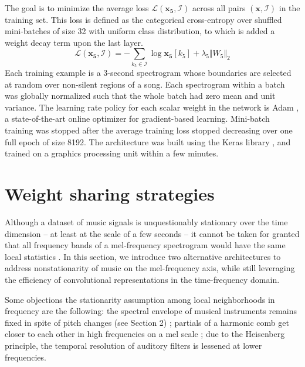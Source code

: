 \documentclass{article}
\begin{document}
The goal is to minimize the average loss $\mathscr{L}(\boldsymbol{x_5}, \mathcal{I})$
across all pairs $(\boldsymbol{x}, \mathcal{I})$ in the training set. This loss is defined as
the categorical cross-entropy over shuffled mini-batches of size 32 with uniform
class distribution, to which is added a weight decay term upon the last layer.
\begin{equation}
\mathscr{L}(\boldsymbol{x_5}, \mathcal{I}) =
- \sum_{k_5 \in \mathcal{I}} \log \boldsymbol{x_5}[k_5]
+ \lambda_5 \Vert W_5 \Vert_2
\end{equation}
Each training example is a 3-second spectrogram whose boundaries are selected at random
over non-silent regions of a song.
Each spectrogram within a batch was globally normalized
such that the whole batch had zero mean and unit variance.
The learning rate policy for each scalar weight in the network is Adam \cite{Kingma2015},
a state-of-the-art online optimizer for gradient-based learning.
Mini-batch training was stopped after the average training loss stopped
decreasing over one full epoch of size 8192.
The architecture was built using the Keras library \cite{Chollet2015},
and trained on a graphics processing unit within a few minutes.

\section{Weight sharing strategies}
Although a dataset of music signals is unquestionably stationary over the time
dimension -- at least at the scale of a few seconds -- it cannot be taken for granted
that all frequency bands of a mel-frequency spectrogram would have the same
local statistics \cite{Humphrey2013}.
In this section, we introduce two alternative architectures to address
nonstationarity of music on the mel-frequency axis,
while still leveraging the efficiency of convolutional representations in the
time-frequency domain.
 
Some objections the stationarity assumption among local neighborhoods in frequency
are the following:
the spectral envelope of musical instruments remains fixed in spite of
pitch changes (see Section 2) ;
partials of a harmonic comb get closer to each other in high frequencies on a mel scale ;
due to the Heisenberg principle, the temporal resolution of auditory filters is lessened at
lower frequencies.
\end{document}
